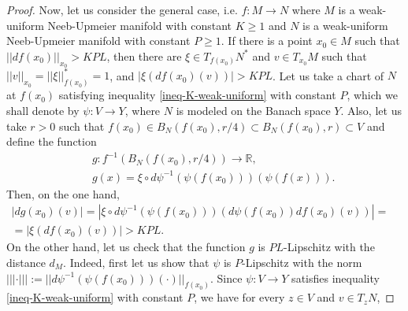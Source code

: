 \documentclass[11pt]{amsart}
\numberwithin{equation}{section}
\begin{document}
\begin{proof}
Now, let us consider the general case, i.e.  $f:M\to N$ where $M$ is a weak-uniform Neeb-Upmeier
manifold with constant $K\ge 1$ and  $N$ is a weak-uniform Neeb-Upmeier manifold with constant $P\ge 1$. If there is a point $x_0\in M$ such that $||df(x_0)||_{x_0}>KPL$, then there are $\xi \in T_{f(x_0)}N^*$ and $v \in T_{x_0} M$ such that $||v||_{x_0}=||\xi||^*_{f(x_0)}=1$, and $|\xi(df(x_0)(v))|>KPL$.  Let us take  a chart of $N$ at $f(x_0)$ satisfying inequality \eqref{ineq-K-weak-uniform} with constant $P$, which we shall denote by $\psi:V\to Y$, where $N$ is modeled on the Banach space $Y$. Also, let us take $r>0$ such that $f(x_0)\in B_N(f(x_0),r/4)\subset B_N(f(x_0),r)\subset V$ and define the function
\begin{eqnarray*}
&&g: f^{-1}(B_N(f(x_0),r/4))\to {\mathbb{R}},
\\
&&g(x)=\xi\circ d\psi^{-1}(\psi(f(x_0)))(\psi(f(x))).
\end{eqnarray*}
Then, on the one hand,
\begin{align}\label{equation:derivadag}
|d g(x_0)(v)|=|\xi\circ d\psi^{-1}(\psi(f(x_0)))(d\psi(f(x_0))df(x_0)(v))|=&\\
=|\xi(d f(x_0)(v))|>KPL.&\nonumber
\end{align}
On the other hand, let us check that the function $g$ is  $PL$-Lipschitz with the distance $d_M$. Indeed, first let us show
 that $\psi$ is $P$-Lipschitz with the norm $|||\cdot|||:=|| d\psi^{-1}(\psi(f(x_0)))(\cdot)||_{f(x_0)}$. Since  $\psi :V\to Y$ satisfies
 inequality \eqref{ineq-K-weak-uniform} with constant $P$,  we have for every $z\in V$ and $v\in T_z N$,
 

\end{proof}
\end{document}
